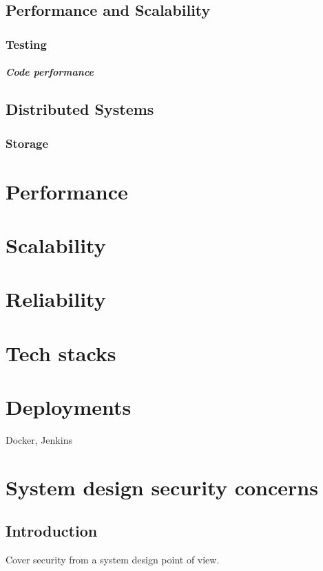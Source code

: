 \documentclass[a4paper, 11pt]{book}
\begin{document}
    \section{Performance and Scalability}

    \subsection{Testing}

    \paragraph{Code performance}


    \section{Distributed Systems}

    \subsection{Storage}


    \chapter{Performance}


    \chapter{Scalability}


    \chapter{Reliability}


    \chapter{Tech stacks}


    \chapter{Deployments}
    Docker, Jenkins


    \chapter{System design security concerns}


    \section{Introduction}
    Cover security from a system design point of view.
\end{document}

